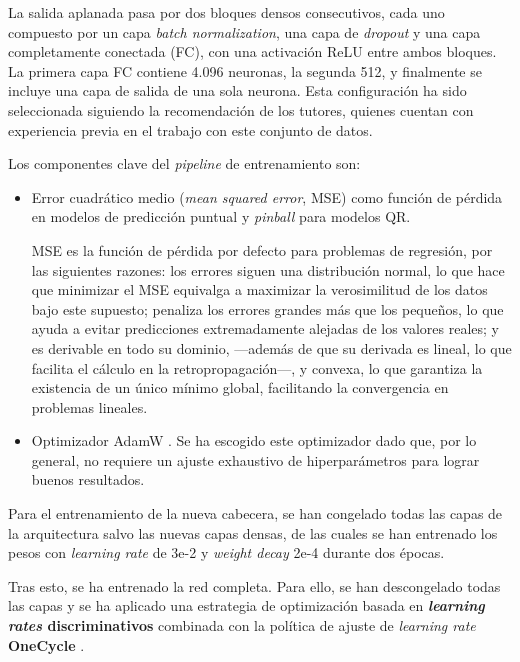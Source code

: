 La salida aplanada pasa por dos bloques densos consecutivos, cada uno compuesto por un capa 
\textit{batch normalization}, una capa de \textit{dropout} y una capa completamente conectada (FC), 
con una activación ReLU entre ambos bloques. La primera capa FC contiene 4.096 neuronas, la segunda 512, y 
finalmente se incluye una capa de salida de una sola neurona. 
Esta configuración ha sido seleccionada siguiendo la recomendación de los tutores, quienes cuentan con 
experiencia previa en el trabajo con este conjunto de datos.


Los componentes clave del \textit{pipeline} de entrenamiento son:

\begin{itemize}
    \item Error cuadrático medio (\textit{mean squared error}, MSE) como función de pérdida en modelos de 
    predicción puntual y \textit{pinball} para modelos QR. 
    
    MSE es la función de pérdida por defecto para problemas de regresión, por las siguientes razones: los 
    errores siguen una distribución normal, lo que hace que minimizar el MSE equivalga a maximizar la 
    verosimilitud de los datos bajo este supuesto; penaliza los errores grandes más que los pequeños, lo que 
    ayuda a evitar predicciones extremadamente alejadas de los valores reales; y es derivable en todo su 
    dominio, ---además de que su derivada es lineal, lo que facilita el cálculo en la retropropagación---, 
    y convexa, lo que garantiza la existencia de un único mínimo global, facilitando la convergencia en 
    problemas lineales.
        
    \item Optimizador AdamW \cite{loshchilov2017}. Se ha escogido este optimizador dado que, por lo general,
    no requiere un ajuste exhaustivo de hiperparámetros para lograr buenos resultados. 
    
\end{itemize}

Para el entrenamiento de la nueva cabecera, se han congelado todas las capas de la arquitectura salvo las 
nuevas capas densas, de las cuales se han entrenado los pesos con \textit{learning rate} de 3e-2 y 
\textit{weight decay} 2e-4 durante dos épocas.

Tras esto, se ha entrenado la red completa. Para ello, se han descongelado todas las capas y se ha aplicado 
una estrategia de optimización basada en \textbf{\textit{learning rates} discriminativos} combinada con
la política de ajuste de \textit{learning rate} \textbf{OneCycle} \cite{smith2018}.

